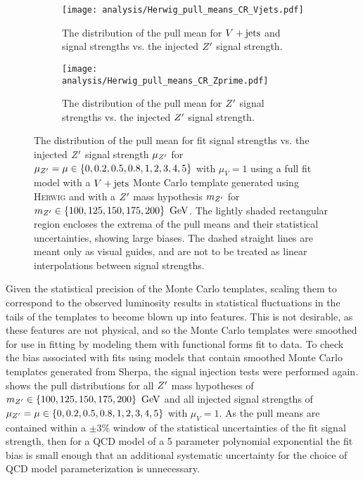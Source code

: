 \begin{figure}[htbp]
 \centering
 \begin{subfigure}[t]{0.48\textwidth}
  \centering
  \texttt{[image: analysis/Herwig\_pull\_means\_CR\_Vjets.pdf]}
  \caption[The distribution of the pull mean for $\Vjets$ and signal strengths vs. the injected $\Zprime$ signal strength.]{%
   The distribution of the pull mean for $\Vjets$ and signal strengths vs. the injected $\Zprime$ signal strength.}
  \label{fig:pulls_Vjets_Herwig}
 \end{subfigure}%
 \quad
 \begin{subfigure}[t]{0.48\textwidth}
  \centering
  \texttt{[image: analysis/Herwig\_pull\_means\_CR\_Zprime.pdf]}
  \caption[The distribution of the pull mean for $\Zprime$ signal strengths vs. the injected $\Zprime$ signal strength.]{%
   The distribution of the pull mean for $\Zprime$ signal strengths vs. the injected $\Zprime$ signal strength.}
  \label{fig:pulls_Zprime_Herwig}
 \end{subfigure}
 \caption[The distribution of the pull mean for fit signal strengths vs. the injected $\Zprime$ signal strength with \textsc{Herwig} Monte Carlo templates.]{%
  The distribution of the pull mean for fit signal strengths vs. the injected $\Zprime$ signal strength $\mu_{Z'}$ for $\mu_{Z'} = \mu \in \left\{0, 0.2, 0.5, 0.8, 1, 2, 3, 4, 5\right\}$ with $\mu_{V} = 1$ using a full fit model with a $\Vjets$ Monte Carlo template generated using \textsc{Herwig} and with a $\Zprime$ mass hypothesis $m_{Z'}$ for
  $m_{Z'} \in \left\{100, 125, 150, 175, 200\right\}~\mathrm{GeV}$.
  The lightly shaded rectangular region encloses the extrema of the pull means and their statistical uncertainties, showing large biases.
  The dashed straight lines are meant only as visual guides, and are not to be treated as linear interpolations between signal strengths.}
 \label{fig:pulls_summary_Herwig}
\end{figure}

Given the statistical precision of the Monte Carlo templates, scaling them to correspond to the observed luminosity results in statistical fluctuations in the tails of the templates to become blown up into features.
This is not desirable, as these features are not physical, and so the Monte Carlo templates were smoothed for use in fitting by modeling them with functional forms fit to data.
To check the bias associated with fits using models that contain smoothed Monte Carlo templates generated from Sherpa, the signal injection tests were performed again.
 shows the pull distributions for all $\Zprime$ mass hypotheses of $m_{Z'} \in \left\{100, 125, 150, 175, 200\right\}~\mathrm{GeV}$ and all injected signal strengths of $\mu_{Z'} = \mu \in \left\{0, 0.2, 0.5, 0.8, 1, 2, 3, 4, 5\right\}$ with $\mu_{V} = 1$.
As the pull means are contained within a $\pm 3\%$ window of the statistical uncertainties of the fit signal strength, then for a QCD model of a 5 parameter polynomial exponential the fit bias is small enough that an additional systematic uncertainty for the choice of QCD model parameterization is unnecessary.

